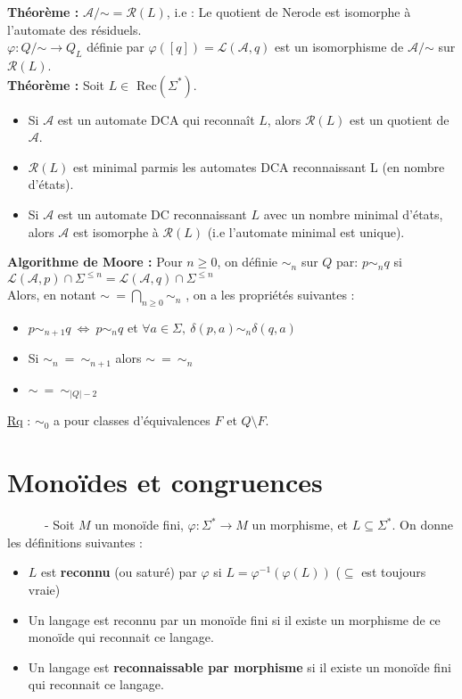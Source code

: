 \documentclass[11pt,a4paper]{article}
\begin{document}
\textbf{Théorème :}  $\mathcal{A}/\mathord\sim = \mathcal{R}(L)$, i.e : Le quotient de Nerode est isomorphe à l'automate des résiduels. \\
$\varphi : Q/\mathord\sim \to Q_L$ définie par $\varphi([q]) = \mathcal{L}(\mathcal{A},q)$ est un isomorphisme de $\mathcal{A}/\mathord\sim$ sur $\mathcal{R}(L)$. \\

\textbf{Théorème :} Soit $L \in $ Rec$(\Sigma^*)$.
\begin{itemize}
\item Si $\mathcal{A}$ est un automate DCA qui reconnaît $L$, alors $\mathcal{R}(L)$ est un quotient de $\mathcal{A}$.
\item $\mathcal{R}(L)$ est minimal parmis les automates DCA reconnaissant L (en nombre d'états).
\item Si $\mathcal{A}$ est un automate DC reconnaissant $L$ avec un nombre minimal d'états, alors $\mathcal{A}$ est isomorphe à $\mathcal{R}(L)$ (i.e l'automate minimal est unique). \\
\end{itemize}

\textbf{Algorithme de Moore :} Pour $n \geq 0$, on définie $\sim_n$ sur $Q$ par:  $p \sim_n q $ si $\mathcal{L}(\mathcal{A},p)\cap \Sigma^{\leq n} = \mathcal{L}(\mathcal{A},q)\cap \Sigma^{\leq n} $ \\
Alors, en notant $\sim\  = \bigcap\limits_{n\geq 0} \sim_n$ , on a les propriétés suivantes :
\begin{itemize}
\item $p \sim_{n+1} q  \ \Leftrightarrow \ p \sim_n q $ et $  \forall a \in \Sigma, \ \delta(p,a) \sim_n \delta(q,a)$
\item Si $\sim_n \ = \ \sim_{n+1}$ alors $\sim \ = \ \sim_n$
\item $\sim \ = \ \sim_{|Q|-2}$ \\
\end{itemize}

\underline{Rq} : $\sim_0$ a pour classes d'équivalences $F$ et $Q \setminus F$. 

\section{Monoïdes et congruences}

\ \ \ \ \ \ - Soit $M$ un monoïde fini, $\varphi : \Sigma^* \to M$ un morphisme, et $L \subseteq \Sigma^*$. On donne les définitions suivantes : 
\begin{itemize}
\item $L$ est \textbf{reconnu} (ou saturé) par $\varphi$ si $L = \varphi^{-1}(\varphi(L))$ ($\subseteq$ est toujours vraie)
\item Un langage est reconnu par un monoïde fini si il existe un morphisme de ce monoïde qui reconnait ce langage.
\item Un langage est \textbf{reconnaissable par morphisme} si il existe un monoïde fini qui reconnait ce langage. \\
\end{itemize}
\end{document}
